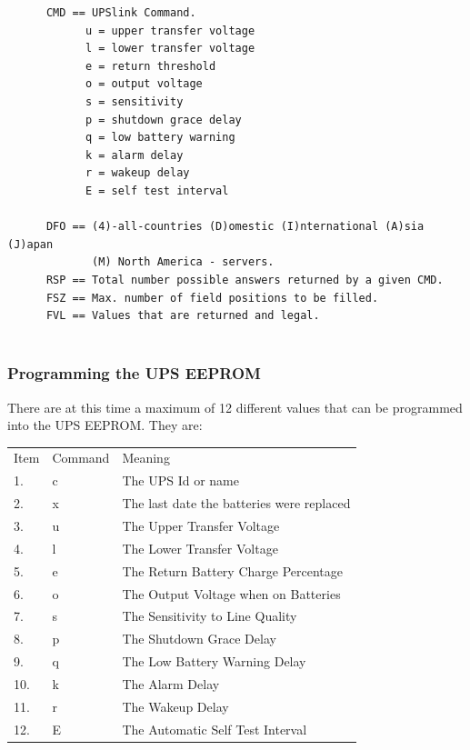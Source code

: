 {{{{{{{{{{{{{{{{{\begin{verbatim}
      CMD == UPSlink Command.
            u = upper transfer voltage
            l = lower transfer voltage
            e = return threshold
            o = output voltage
            s = sensitivity
            p = shutdown grace delay
            q = low battery warning
            k = alarm delay
            r = wakeup delay
            E = self test interval
     
      DFO == (4)-all-countries (D)omestic (I)nternational (A)sia (J)apan
             (M) North America - servers.
      RSP == Total number possible answers returned by a given CMD.
      FSZ == Max. number of field positions to be filled.
      FVL == Values that are returned and legal.
     
\end{verbatim}
\normalsize

\label{Programming-the-UPS-EEPROM}

\subsubsection*{Programming the UPS EEPROM}

There are at this time a maximum of 12 different values that can be programmed
into the UPS EEPROM. They are:  

\begin{longtable}{lll}
{Item} & {Command} & {Meaning 
 } \\
{1.} & {c} & {The UPS Id or name 
 } \\
{2.} & {x} & {The last date the batteries were replaced 
 } \\
{3.} & {u} & {The Upper Transfer Voltage 
 } \\
{4.} & {l} & {The Lower Transfer Voltage 
 } \\
{5.} & {e} & {The Return Battery Charge Percentage 
 } \\
{6.} & {o} & {The Output Voltage when on Batteries 
 } \\
{7.} & {s} & {The Sensitivity to Line Quality 
 } \\
{8.} & {p} & {The Shutdown Grace Delay 
 } \\
{9.} & {q} & {The Low Battery Warning Delay 
 } \\
{10.} & {k} & {The Alarm Delay 
 } \\
{11.} & {r} & {The Wakeup Delay 
 } \\
{12.} & {E} & {The Automatic Self Test Interval  
}


\end{longtable}}}}}}}}}}}}}}}}}}
